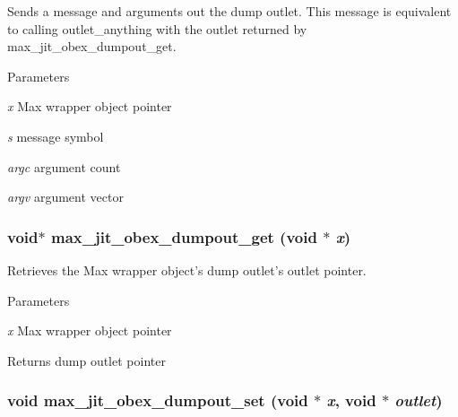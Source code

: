 Sends a message and arguments out the dump outlet. This message is equivalent to calling outlet\_\-anything with the outlet returned by max\_\-jit\_\-obex\_\-dumpout\_\-get.


\begin{DoxyParams}{Parameters}
\item[{\em x}]Max wrapper object pointer \item[{\em s}]message symbol \item[{\em argc}]argument count \item[{\em argv}]argument vector \end{DoxyParams}
\hypertarget{group__maxwrapmod_gae0f179c644d50a572a7c159db83490a5}{
\subsubsection[{max\_\-jit\_\-obex\_\-dumpout\_\-get}]{\setlength{\rightskip}{0pt plus 5cm}void$\ast$ max\_\-jit\_\-obex\_\-dumpout\_\-get (void $\ast$ {\em x})}}
\label{group__maxwrapmod_gae0f179c644d50a572a7c159db83490a5}


Retrieves the Max wrapper object's dump outlet's outlet pointer. 
\begin{DoxyParams}{Parameters}
\item[{\em x}]Max wrapper object pointer\end{DoxyParams}
\begin{DoxyReturn}{Returns}
dump outlet pointer 
\end{DoxyReturn}
\hypertarget{group__maxwrapmod_ga8e63a402ecf8cef78a9093c774159a9e}{
\subsubsection[{max\_\-jit\_\-obex\_\-dumpout\_\-set}]{\setlength{\rightskip}{0pt plus 5cm}void max\_\-jit\_\-obex\_\-dumpout\_\-set (void $\ast$ {\em x}, \/  void $\ast$ {\em outlet})}}
\label{group__maxwrapmod_ga8e63a402ecf8cef78a9093c774159a9e}


